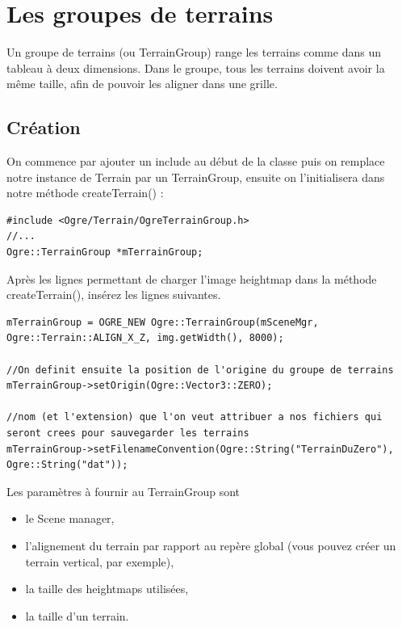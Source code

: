 \section{Les groupes de terrains}

Un groupe de terrains (ou TerrainGroup) range les terrains comme dans un tableau à deux dimensions. Dans le groupe, tous les terrains doivent avoir la même taille, afin de pouvoir les aligner dans une grille.



\subsection{Création}

On commence par ajouter un include au début de la classe puis on remplace notre instance de Terrain par un TerrainGroup, ensuite on l'initialisera dans notre méthode createTerrain() :

\begin{lstlisting}[caption={TerrainGroup: include et création}]
#include <Ogre/Terrain/OgreTerrainGroup.h>
//...
Ogre::TerrainGroup *mTerrainGroup;
\end{lstlisting}

Après les lignes permettant de charger l'image heightmap dans la méthode createTerrain(), insérez les lignes suivantes.

\begin{lstlisting}[caption={}]
mTerrainGroup = OGRE_NEW Ogre::TerrainGroup(mSceneMgr, Ogre::Terrain::ALIGN_X_Z, img.getWidth(), 8000);

//On definit ensuite la position de l'origine du groupe de terrains
mTerrainGroup->setOrigin(Ogre::Vector3::ZERO);

//nom (et l'extension) que l'on veut attribuer a nos fichiers qui seront crees pour sauvegarder les terrains
mTerrainGroup->setFilenameConvention(Ogre::String("TerrainDuZero"), Ogre::String("dat"));
\end{lstlisting}

Les paramètres à fournir au TerrainGroup sont
\begin{itemize}
\item le Scene manager,
\item l'alignement du terrain par rapport au repère global (vous pouvez créer un terrain vertical, par exemple),
\item la taille des heightmaps utilisées, 
\item la taille d'un terrain.
\end{itemize}

